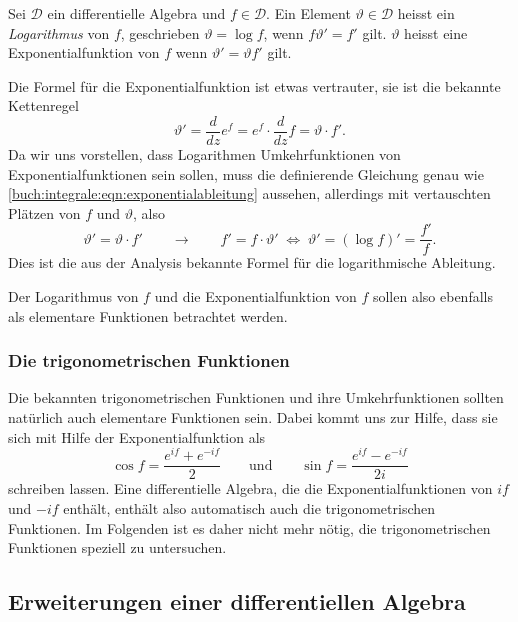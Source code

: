 \begin{definition}
\label{buch:integrale:def:logexp}
Sei $\mathscr{D}$ ein differentielle Algebra und $f\in\mathscr{D}$.
Ein Element $\vartheta\in\mathscr{D}$ heisst ein {\em Logarithmus}
von $f$, geschrieben $\vartheta = \log f$, wenn $f\vartheta' = f'$ gilt.
$\vartheta$ heisst eine Exponentialfunktion von $f$ wenn
$\vartheta'=\vartheta f'$ gilt.
\end{definition}

Die Formel für die Exponentialfunktion ist etwas vertrauter, sie ist
die bekannte Kettenregel
\begin{equation}
\vartheta'
=
\frac{d}{dz} e^f
=
e^f \cdot \frac{d}{dz} f
=
\vartheta \cdot f'.
\label{buch:integrale:eqn:exponentialableitung}
\end{equation}
Da wir uns vorstellen, dass Logarithmen Umkehrfunktionen von 
Exponentialfunktionen sein sollen, 
muss die definierende Gleichung genau wie
\eqref{buch:integrale:eqn:exponentialableitung}
aussehen, allerdings mit vertauschten Plätzen von $f$ und $\vartheta$,
also 
\begin{equation}
\vartheta' = \vartheta\cdot f'
\qquad
\rightarrow
\qquad
f' = f\cdot \vartheta'
\;\Leftrightarrow\;
\vartheta' = (\log f)' = \frac{f'}{f}.
\label{buch:integrale:eqn:logarithmischeableitung}
\end{equation}
Dies ist die aus der Analysis bekannte Formel für die logarithmische
Ableitung.

Der Logarithmus von $f$ und die Exponentialfunktion von $f$ sollen
also ebenfalls als elementare Funktionen betrachtet werden.

\subsubsection{Die trigonometrischen Funktionen}
Die bekannten trigonometrischen Funktionen und ihre Umkehrfunktionen
sollten natürlich auch elementare Funktionen sein.
Dabei kommt uns zur Hilfe, dass sie sich mit Hilfe der Exponentialfunktion
als
\[
\cos f = \frac{e^{if}+e^{-if}}2
\qquad\text{und}\qquad
\sin f = \frac{e^{if}-e^{-if}}{2i}
\]
schreiben lassen.
Eine differentielle Algebra, die die Exponentialfunktionen von $if$ und
$-if$ enthält, enthält also automatisch auch die trigonometrischen
Funktionen.
Im Folgenden ist es daher nicht mehr nötig, die trigonometrischen
Funktionen speziell zu untersuchen.

\subsection{Erweiterungen einer differentiellen Algebra
\label{buch:integrale:section:erweiterungen}}


